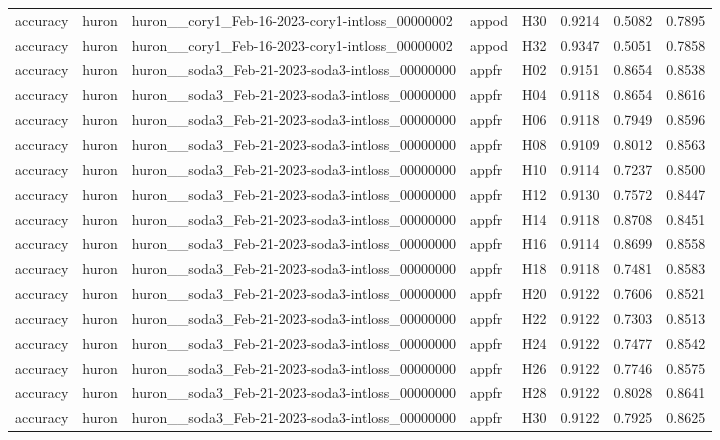 \begin{table}[tbp]
\begin{tabular}{lllllrrr}
accuracy & huron & huron\_\_cory1\_Feb-16-2023-cory1-intloss\_00000002 & appod & H30 & 0.9214 & 0.5082 & 0.7895 \\
accuracy & huron & huron\_\_cory1\_Feb-16-2023-cory1-intloss\_00000002 & appod & H32 & 0.9347 & 0.5051 & 0.7858 \\
accuracy & huron & huron\_\_soda3\_Feb-21-2023-soda3-intloss\_00000000 & appfr & H02 & 0.9151 & 0.8654 & 0.8538 \\
accuracy & huron & huron\_\_soda3\_Feb-21-2023-soda3-intloss\_00000000 & appfr & H04 & 0.9118 & 0.8654 & 0.8616 \\
accuracy & huron & huron\_\_soda3\_Feb-21-2023-soda3-intloss\_00000000 & appfr & H06 & 0.9118 & 0.7949 & 0.8596 \\
accuracy & huron & huron\_\_soda3\_Feb-21-2023-soda3-intloss\_00000000 & appfr & H08 & 0.9109 & 0.8012 & 0.8563 \\
accuracy & huron & huron\_\_soda3\_Feb-21-2023-soda3-intloss\_00000000 & appfr & H10 & 0.9114 & 0.7237 & 0.8500 \\
accuracy & huron & huron\_\_soda3\_Feb-21-2023-soda3-intloss\_00000000 & appfr & H12 & 0.9130 & 0.7572 & 0.8447 \\
accuracy & huron & huron\_\_soda3\_Feb-21-2023-soda3-intloss\_00000000 & appfr & H14 & 0.9118 & 0.8708 & 0.8451 \\
accuracy & huron & huron\_\_soda3\_Feb-21-2023-soda3-intloss\_00000000 & appfr & H16 & 0.9114 & 0.8699 & 0.8558 \\
accuracy & huron & huron\_\_soda3\_Feb-21-2023-soda3-intloss\_00000000 & appfr & H18 & 0.9118 & 0.7481 & 0.8583 \\
accuracy & huron & huron\_\_soda3\_Feb-21-2023-soda3-intloss\_00000000 & appfr & H20 & 0.9122 & 0.7606 & 0.8521 \\
accuracy & huron & huron\_\_soda3\_Feb-21-2023-soda3-intloss\_00000000 & appfr & H22 & 0.9122 & 0.7303 & 0.8513 \\
accuracy & huron & huron\_\_soda3\_Feb-21-2023-soda3-intloss\_00000000 & appfr & H24 & 0.9122 & 0.7477 & 0.8542 \\
accuracy & huron & huron\_\_soda3\_Feb-21-2023-soda3-intloss\_00000000 & appfr & H26 & 0.9122 & 0.7746 & 0.8575 \\
accuracy & huron & huron\_\_soda3\_Feb-21-2023-soda3-intloss\_00000000 & appfr & H28 & 0.9122 & 0.8028 & 0.8641 \\
accuracy & huron & huron\_\_soda3\_Feb-21-2023-soda3-intloss\_00000000 & appfr & H30 & 0.9122 & 0.7925 & 0.8625 \\

\end{tabular}
\end{table}
